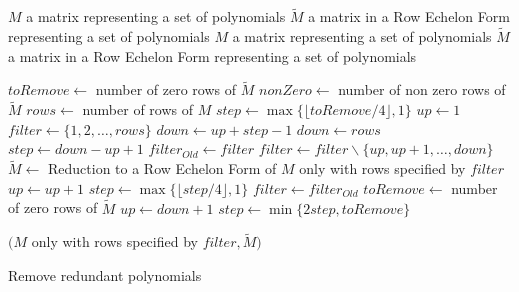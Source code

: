 \begin{algorithm}[!ht]
  \begin{algorithmic}[1]
    \Require
      \Statex $M$ a matrix representing a set of polynomials
      \Statex $\tilde{M}$ a matrix in a Row Echelon Form representing a set of polynomials
    \Ensure
      \Statex $M$ a matrix representing a set of polynomials
      \Statex $\tilde{M}$ a matrix in a Row Echelon Form representing a set of polynomials
      \Statex

      \State $toRemove \gets $ number of zero rows of $\tilde{M}$
      \State $nonZero \gets$ number of non zero rows of $\tilde{M}$
      \State $rows \gets$ number of rows of $M$
      \State $step \gets \max\{\lfloor toRemove/4\rfloor, 1\}$ 
      \State $up \gets 1$
      \State $filter \gets \{1,2,\dots,rows\}$
        \State $down \gets up + step - 1$
          \State $down \gets rows$
	  \State $step \gets down - up + 1$
	\EndIf
	\State $filter_{Old} \gets filter$
	\State $filter \gets filter \backslash \{up, up+1, \dots, down\}$
	\State $\tilde{M} \gets$ Reduction to a Row Echelon Form of $M$ only with rows specified by $filter$
	    \State $up \gets up + 1$
	  \Else
            \State $step \gets \max\{\lfloor step/4\rfloor, 1\}$
	  \EndIf
	  \State $filter \gets filter_{Old}$
	\Else
	  \State $toRemove \gets$ number of zero rows of $\tilde{M}$
          \State $up \gets down + 1$
	  \State $step \gets \min\{2 step, toRemove\}$
	\EndIf
      \EndWhile

      \State \Return $(M$ only with rows specified by $filter, \tilde{M})$
  \end{algorithmic}
  \caption{Remove redundant polynomials}
  \label{alg:removeRedundant}
\end{algorithm}

